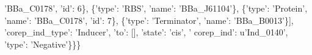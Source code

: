 \begin{DoxyCode}
{      'BBa\_C0178'}, \textcolor{stringliteral}{'id'}: 6\}, \{\textcolor{stringliteral}{'type'}: \textcolor{stringliteral}{'RBS'}, \textcolor{stringliteral}{'name'}: \textcolor{stringliteral}{'BBa\_J61104'}\}, \{\textcolor{stringliteral}{'type'}: \textcolor{stringliteral}{'Protein'}, \textcolor{stringliteral}{'name'}: \textcolor{stringliteral}{'BBa\_C0178'}, \textcolor{stringliteral}{'id'}:
       7\}, \{\textcolor{stringliteral}{'type'}: \textcolor{stringliteral}{'Terminator'}, \textcolor{stringliteral}{'name'}: \textcolor{stringliteral}{'BBa\_B0013'}\}], \textcolor{stringliteral}{'corep\_ind\_type'}: \textcolor{stringliteral}{'Inducer'}, \textcolor{stringliteral}{'to'}: [], \textcolor{stringliteral}{'state'}: \textcolor{stringliteral}{'cis'}, \textcolor{stringliteral}{'
      corep\_ind'}: \textcolor{stringliteral}{u'Ind\_0140'}, \textcolor{stringliteral}{'type'}: \textcolor{stringliteral}{'Negative'}\}\}\}
\end{DoxyCode}
